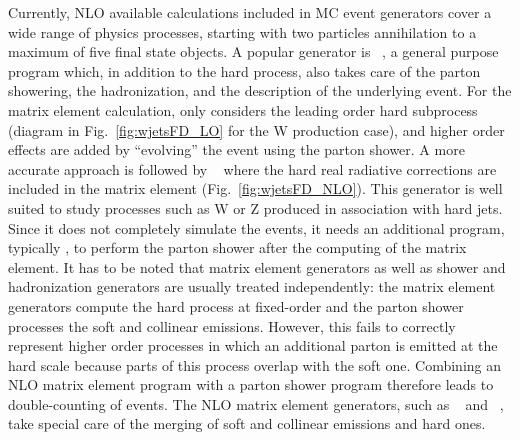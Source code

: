 Currently, NLO available calculations included in MC event generators cover a wide range of physics processes, starting with two particles annihilation to a maximum of five final state objects.
A popular generator is \PYTHIA{}~\cite{Sjostrand:2007gs,Sjostrand:2006za}, a general purpose program which, in addition to the hard process, also takes care of the parton showering, the hadronization, and the description of the underlying event.
For the matrix element calculation, \PYTHIA{} only considers the leading order hard subprocess (diagram in Fig.~\ref{fig:wjetsFD_LO} for the W production case), and higher
order effects are added by ``evolving'' the event using the parton shower.
A more accurate approach is followed by \MADGRAPH{}~\cite{Alwall:2011uj} where the hard real radiative
corrections are included in the matrix element (Fig.~\ref{fig:wjetsFD_NLO}). %
This generator is well suited to study processes such as W or Z produced in association with hard jets.
Since it does not completely simulate the events, it needs an additional program, typically \PYTHIA{}, to perform the parton shower after the computing of the matrix element.
It has to be noted that matrix element generators as well as shower and hadronization generators are usually treated independently: the matrix element generators compute the hard process at fixed-order and the parton shower processes the soft and collinear emissions. However, this fails to correctly represent higher order processes in which an additional parton is emitted at the hard scale because parts of this process overlap with the soft one. Combining an NLO matrix element program with a parton shower program therefore leads to double-counting of events. The NLO matrix element generators, such as \POWHEG{}~\cite{Frixione:2007vw} and \MCATNLO{}~\cite{Frixione:2003ei}, take special care of the merging of soft and collinear emissions and hard ones.

